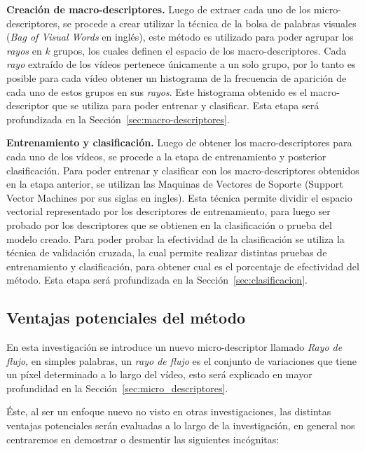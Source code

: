 \textbf{Creación de macro-descriptores.}
Luego de extraer cada uno de los micro-descriptores, se procede a crear utilizar la técnica de la bolsa de palabras visuales (\textit{Bag of Visual Words} en inglés), este método es utilizado para poder agrupar los \textit{rayos} en $k$ grupos, los cuales definen el espacio de los macro-descriptores. Cada \textit{rayo} extraído de los vídeos pertenece únicamente a un solo grupo, por lo tanto es posible para cada vídeo obtener un histograma de la frecuencia de aparición de cada uno de estos grupos en sus \textit{rayos}. Este histograma obtenido es el macro-descriptor que se utiliza para poder entrenar y clasificar. Esta etapa será profundizada en la Sección~\ref{sec:macro-descriptores}.


\textbf{Entrenamiento y clasificación.}
Luego de obtener los macro-des\-crip\-tores para cada uno de los vídeos, se procede a la etapa de entrenamiento y posterior clasificación. Para poder entrenar y clasificar con los macro-descriptores obtenidos en la etapa anterior, se utilizan las Maquinas de Vectores de Soporte (Support Vector Machines por sus siglas en ingles). Esta técnica permite dividir el espacio vectorial representado por los descriptores de entrenamiento, para luego ser probado por los descriptores que se obtienen en la clasificación o prueba del modelo creado. Para poder probar la efectividad de la clasificación se utiliza la técnica de validación cruzada, la cual permite realizar distintas pruebas de entrenamiento y clasificación, para obtener cual es el porcentaje de efectividad del método. Esta etapa será profundizada en la Sección~\ref{sec:clasificacion}.

\subsection{Ventajas potenciales del método}
En esta investigación se introduce un nuevo micro-descriptor llamado \textit{Rayo de flujo}, en simples palabras, 
un \textit{rayo de flujo} es el conjunto de variaciones que tiene un píxel determinado a lo largo del vídeo, esto será explicado en mayor profundidad en la Sección~\ref{sec:micro_descriptores}.

Éste, al ser un enfoque nuevo no visto en otras investigaciones, las distintas ventajas potenciales serán evaluadas a lo largo de la investigación, en general nos centraremos en demostrar o desmentir las siguientes incógnitas:

